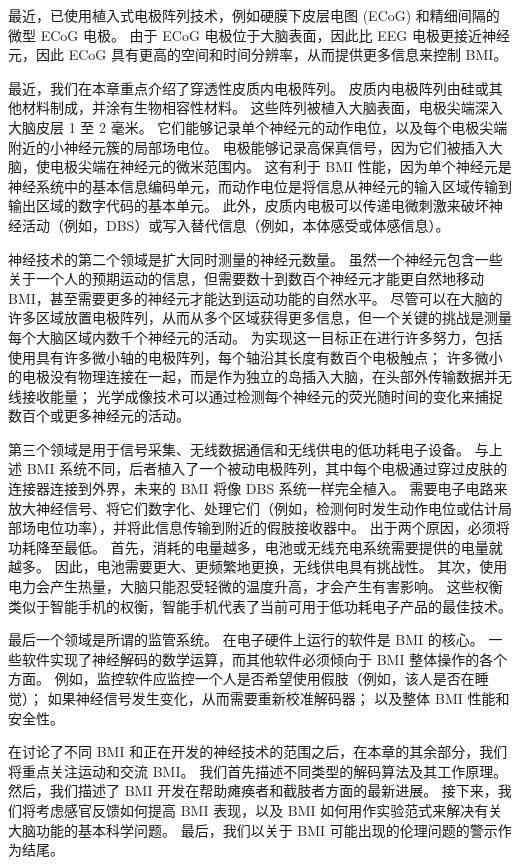 最近，已使用植入式电极阵列技术，例如硬膜下皮层电图 (ECoG) 和精细间隔的微型 ECoG 电极。 
由于 ECoG 电极位于大脑表面，因此比 EEG 电极更接近神经元，因此 ECoG 具有更高的空间和时间分辨率，从而提供更多信息来控制 BMI。


最近，我们在本章重点介绍了穿透性皮质内电极阵列。 
皮质内电极阵列由硅或其他材料制成，并涂有生物相容性材料。 
这些阵列被植入大脑表面，电极尖端深入大脑皮层 1 至 2 毫米。 
它们能够记录单个神经元的动作电位，以及每个电极尖端附近的小神经元簇的局部场电位。 
电极能够记录高保真信号，因为它们被插入大脑，使电极尖端在神经元的微米范围内。 
这有利于 BMI 性能，因为单个神经元是神经系统中的基本信息编码单元，而动作电位是将信息从神经元的输入区域传输到输出区域的数字代码的基本单元。 
此外，皮质内电极可以传递电微刺激来破坏神经活动（例如，DBS）或写入替代信息（例如，本体感受或体感信息）。


神经技术的第二个领域是扩大同时测量的神经元数量。 
虽然一个神经元包含一些关于一个人的预期运动的信息，但需要数十到数百个神经元才能更自然地移动 BMI，甚至需要更多的神经元才能达到运动功能的自然水平。 
尽管可以在大脑的许多区域放置电极阵列，从而从多个区域获得更多信息，但一个关键的挑战是测量每个大脑区域内数千个神经元的活动。 
为实现这一目标正在进行许多努力，包括使用具有许多微小轴的电极阵列，每个轴沿其长度有数百个电极触点； 许多微小的电极没有物理连接在一起，而是作为独立的岛插入大脑，在头部外传输数据并无线接收能量； 光学成像技术可以通过检测每个神经元的荧光随时间的变化来捕捉数百个或更多神经元的活动。


第三个领域是用于信号采集、无线数据通信和无线供电的低功耗电子设备。 
与上述 BMI 系统不同，后者植入了一个被动电极阵列，其中每个电极通过穿过皮肤的连接器连接到外界，未来的 BMI 将像 DBS 系统一样完全植入。 
需要电子电路来放大神经信号、将它们数字化、处理它们（例如，检测何时发生动作电位或估计局部场电位功率），并将此信息传输到附近的假肢接收器中。 
出于两个原因，必须将功耗降至最低。 
首先，消耗的电量越多，电池或无线充电系统需要提供的电量就越多。 
因此，电池需要更大、更频繁地更换，无线供电具有挑战性。 
其次，使用电力会产生热量，大脑只能忍受轻微的温度升高，才会产生有害影响。 
这些权衡类似于智能手机的权衡，智能手机代表了当前可用于低功耗电子产品的最佳技术。


最后一个领域是所谓的监管系统。 
在电子硬件上运行的软件是 BMI 的核心。 
一些软件实现了神经解码的数学运算，而其他软件必须倾向于 BMI 整体操作的各个方面。 
例如，监控软件应监控一个人是否希望使用假肢（例如，该人是否在睡觉）； 
如果神经信号发生变化，从而需要重新校准解码器； 以及整体 BMI 性能和安全性。


在讨论了不同 BMI 和正在开发的神经技术的范围之后，在本章的其余部分，我们将重点关注运动和交流 BMI。 
我们首先描述不同类型的解码算法及其工作原理。 
然后，我们描述了 BMI 开发在帮助瘫痪者和截肢者方面的最新进展。 
接下来，我们将考虑感官反馈如何提高 BMI 表现，以及 BMI 如何用作实验范式来解决有关大脑功能的基本科学问题。 
最后，我们以关于 BMI 可能出现的伦理问题的警示作为结尾。


